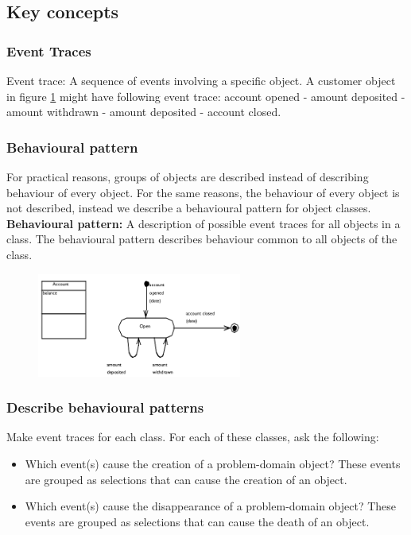 \subsection{Key concepts}
\subsubsection{Event Traces}
Event trace: A sequence of events involving a specific object. A customer object in figure \ref{fig:behaviouralpattern} might have following event trace: account opened - amount deposited - amount withdrawn - amount deposited - account closed. 

\subsubsection{Behavioural pattern}
For practical reasons, groups of objects are described instead of describing behaviour of every object. For the same reasons, the behaviour of every object is not described, instead we describe a behavioural pattern for object classes. \newline \textbf{Behavioural pattern:} A description of possible event traces for all objects in a class. 
The behavioural pattern describes behaviour common to all objects of the class. 

\begin{figure}[h]\label{fig:behaviouralpattern}
    \centering
    \includegraphics[width=0.6\textwidth]{figures/behaviouralpattern.png}
\end{figure}

\subsubsection{Describe behavioural patterns}
Make event traces for each class. For each of these classes, ask the following:

\begin{itemize}
    \item Which event(s) cause the creation of a problem-domain object? \newline These events are grouped as selections that can cause the creation of an object.
    \item Which event(s) cause the disappearance of a problem-domain object? \newline These events are grouped as selections that can cause the death of an object.
\end{itemize}

